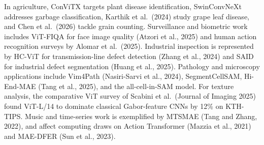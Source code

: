 In agriculture, ConViTX targets plant disease identification, SwinConvNeXt addresses garbage classification, Karthik et al.~(2024) study grape leaf disease, and Chen et al.~(2026) tackle grain counting. Surveillance and biometric work includes ViT-FIQA for face image quality (Atzori et al., 2025) and human action recognition surveys by Alomar et al.~(2025). Industrial inspection is represented by HC-ViT for transmission-line defect detection (Zhang et al., 2024) and SAID for industrial defect segmentation (Huang et al., 2025). Pathology and microscopy applications include Vim4Path (Nasiri-Sarvi et al., 2024), SegmentCellSAM, Hi-End-MAE (Tang et al., 2025), and the all-cell-in-SAM model. For texture analysis, the comparative ViT survey of Scabini et al.~(Journal of Imaging 2025) found ViT-L/14 to dominate classical Gabor-feature CNNs by 12\% on KTH-TIPS. Music and time-series work is exemplified by MTSMAE (Tang and Zhang, 2022), and affect computing draws on Action Transformer (Mazzia et al., 2021) and MAE-DFER (Sun et al., 2023).

